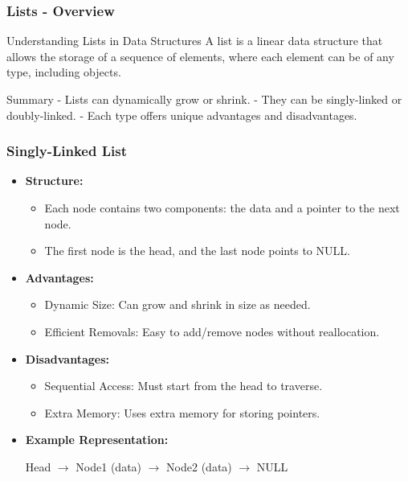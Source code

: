 \documentclass{beamer}
\begin{document}
\begin{frame}[fragile]
    \frametitle{Lists - Overview}
    \begin{block}{Understanding Lists in Data Structures}
        A list is a linear data structure that allows the storage of a sequence of elements, where each element can be of any type, including objects.
    \end{block}
    
    \begin{block}{Summary}
        - Lists can dynamically grow or shrink.
        - They can be singly-linked or doubly-linked.
        - Each type offers unique advantages and disadvantages.
    \end{block}
\end{frame}

\begin{frame}[fragile]
    \frametitle{Singly-Linked List}
    \begin{itemize}
        \item \textbf{Structure:}
        \begin{itemize}
            \item Each node contains two components: the data and a pointer to the next node.
            \item The first node is the head, and the last node points to NULL.
        \end{itemize}
        
        \item \textbf{Advantages:}
        \begin{itemize}
            \item Dynamic Size: Can grow and shrink in size as needed.
            \item Efficient Removals: Easy to add/remove nodes without reallocation.
        \end{itemize}
        
        \item \textbf{Disadvantages:}
        \begin{itemize}
            \item Sequential Access: Must start from the head to traverse.
            \item Extra Memory: Uses extra memory for storing pointers.
        \end{itemize}
        
        \item \textbf{Example Representation:}
        \begin{center}
            Head $\rightarrow$ Node1 (data) $\rightarrow$ Node2 (data) $\rightarrow$ NULL
        \end{center}
    \end{itemize}
\end{frame}
\end{document}

